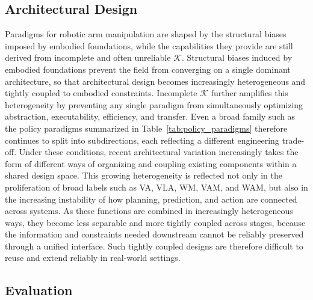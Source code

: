 \documentclass[acmsmall,screen,review]{acmart}
\begin{document}
\subsection{Architectural Design}\label{sec:challenge_learning}

Paradigms for robotic arm manipulation are shaped by the structural biases imposed by embodied foundations, while the capabilities they provide are still derived from incomplete and often unreliable \(\mathcal{K}\). 
Structural biases induced by embodied foundations prevent the field from converging on a single dominant architecture, so that architectural design becomes increasingly heterogeneous and tightly coupled to embodied constraints.
Incomplete \(\mathcal{K}\) further amplifies this heterogeneity by preventing any single paradigm from simultaneously optimizing abstraction, executability, efficiency, and transfer. 
Even a broad family such as the policy paradigms summarized in Table~\ref{tab:policy_paradigms} therefore continues to split into subdirections, each reflecting a different engineering trade-off.
Under these conditions, recent architectural variation increasingly takes the form of different ways of organizing and coupling existing components within a shared design space.
This growing heterogeneity is reflected not only in the proliferation of broad labels such as VA, VLA, WM, VAM, and WAM, but also in the increasing instability of how planning, prediction, and action are connected across systems. 
As these functions are combined in increasingly heterogeneous ways, they become less separable and more tightly coupled across stages, because the information and constraints needed downstream cannot be reliably preserved through a unified interface.
Such tightly coupled designs are therefore difficult to reuse and extend reliably in real-world settings.

\subsection{Evaluation}\label{sec:challenge_evaluation}
\end{document}

